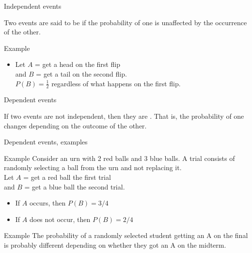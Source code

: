 \documentclass[xcolor=table, aspectratio=169, bigger, handout]{beamer}
\begin{document}
\begin{frame}{Independent events}
\begin{block}{}
Two events are said to be  if the probability of one is unaffected by the occurrence of the other.
\end{block}

\pause

\begin{exampleblock}{Example}
\begin{itemize}
\item Let $A$ = get a head on the first flip\\
and $B$ = get a tail on the second flip.\\
$P(B) = \frac 1 2$ regardless of what happens on the first flip.
\end{itemize}
\end{exampleblock}
\end{frame}

\begin{frame}{Dependent events}
\begin{block}{}
If two events are not independent, then they are . That is, the probability of one changes depending on the outcome of the other.
\end{block}
\end{frame}

\begin{frame}{Dependent events, examples}

\begin{exampleblock}{Example}
Consider an urn with 2 red balls and 3 blue balls. A trial consists of randomly selecting a ball from the urn and not replacing it.\\
\pause
\medskip Let $A$ = get a red ball the first trial\\
 and $B$ = get a blue ball the second trial.
\begin{itemize}
\pause
\item If $A$ occurs, then $P(B) = 3 / 4$
\pause
\item If $A$ does not occur, then $P(B) =  2 / 4$
\end{itemize}
\end{exampleblock}

\pause

\begin{exampleblock}{Example}
The probability of a randomly selected student getting an A on the final is probably different depending on whether they got an A on the midterm.
\end{exampleblock}
\end{frame}
\end{document}
